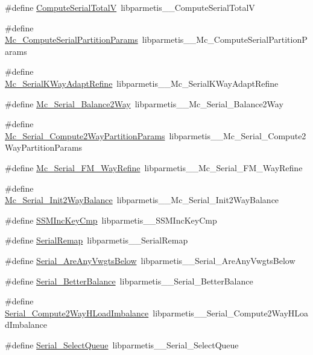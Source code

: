 \begin{DoxyCompactItemize}
\item 
\#define \hyperlink{a00960_a3e2f31315137f9243ff022b7a7660398}{Compute\+Serial\+TotalV}~libparmetis\+\_\+\+\_\+\+Compute\+Serial\+TotalV
\item 
\#define \hyperlink{a00960_a50e4826a45e37b3e5530ebe3d2c9eb62}{Mc\+\_\+\+Compute\+Serial\+Partition\+Params}~libparmetis\+\_\+\+\_\+\+Mc\+\_\+\+Compute\+Serial\+Partition\+Params
\item 
\#define \hyperlink{a00960_a18661d1bee2ded2185712883396d2a6a}{Mc\+\_\+\+Serial\+K\+Way\+Adapt\+Refine}~libparmetis\+\_\+\+\_\+\+Mc\+\_\+\+Serial\+K\+Way\+Adapt\+Refine
\item 
\#define \hyperlink{a00960_a13e4292b5b3c50a04e5c54ba8ebfc35f}{Mc\+\_\+\+Serial\+\_\+\+Balance2\+Way}~libparmetis\+\_\+\+\_\+\+Mc\+\_\+\+Serial\+\_\+\+Balance2\+Way
\item 
\#define \hyperlink{a00960_a102ed198bbb615ba5825cac49d9b0a0b}{Mc\+\_\+\+Serial\+\_\+\+Compute2\+Way\+Partition\+Params}~libparmetis\+\_\+\+\_\+\+Mc\+\_\+\+Serial\+\_\+\+Compute2\+Way\+Partition\+Params
\item 
\#define \hyperlink{a00960_a8e7f712af3077b25bf3cd03ade5d552b}{Mc\+\_\+\+Serial\+\_\+\+F\+M\+\_\+Way\+Refine}~libparmetis\+\_\+\+\_\+\+Mc\+\_\+\+Serial\+\_\+\+F\+M\+\_\+Way\+Refine
\item 
\#define \hyperlink{a00960_ab5d9f18337b0e418a79a5c5eaf64aaf2}{Mc\+\_\+\+Serial\+\_\+\+Init2\+Way\+Balance}~libparmetis\+\_\+\+\_\+\+Mc\+\_\+\+Serial\+\_\+\+Init2\+Way\+Balance
\item 
\#define \hyperlink{a00960_a24f5506df72078f3c25aabaa845bccf0}{S\+S\+M\+Inc\+Key\+Cmp}~libparmetis\+\_\+\+\_\+\+S\+S\+M\+Inc\+Key\+Cmp
\item 
\#define \hyperlink{a00960_a2d1c990f7ab58d45c870f2857568ee8c}{Serial\+Remap}~libparmetis\+\_\+\+\_\+\+Serial\+Remap
\item 
\#define \hyperlink{a00960_a7bbb714ea5e87092ba2da266121b4f77}{Serial\+\_\+\+Are\+Any\+Vwgts\+Below}~libparmetis\+\_\+\+\_\+\+Serial\+\_\+\+Are\+Any\+Vwgts\+Below
\item 
\#define \hyperlink{a00960_a1cbf5b192d36772121b81a106fd7ae1c}{Serial\+\_\+\+Better\+Balance}~libparmetis\+\_\+\+\_\+\+Serial\+\_\+\+Better\+Balance
\item 
\#define \hyperlink{a00960_a7a4e00500bad9b5a76baa9ed341a449b}{Serial\+\_\+\+Compute2\+Way\+H\+Load\+Imbalance}~libparmetis\+\_\+\+\_\+\+Serial\+\_\+\+Compute2\+Way\+H\+Load\+Imbalance
\item 
\#define \hyperlink{a00960_a09cda9983a6ea0f7e0041b7d5e108f6d}{Serial\+\_\+\+Select\+Queue}~libparmetis\+\_\+\+\_\+\+Serial\+\_\+\+Select\+Queue

\end{DoxyCompactItemize}
